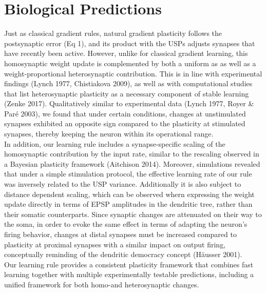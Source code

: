 \documentclass[twocolumn,12pt]{article}
\begin{document}
\section*{Biological Predictions}
\vspace*{-0.3cm}
Just as classical gradient rules, natural gradient plasticity follows the postsynaptic error (Eq 1), and its product with the USPs adjusts synapses that have recently been active. However, unlike for classical gradient learning, this homosynaptic weight update is complemented by both a uniform as as well as a weight-proportional heterosynaptic contribution. This is in line with experimental findings (Lynch 1977, Chistiakova 2009), as well as with computational studies that list heterosynaptic plasticity as a necessary component of stable learning (Zenke 2017). Qualitatively similar to experimental data (Lynch 1977, Royer \& Paré 2003), we found that under certain conditions, changes at unstimulated synapses exhibited an opposite sign compared to the plasticity at stimulated synapses, thereby keeping the neuron within its operational range.\\
In addition, our learning rule includes a synapse-specific scaling of the homosynaptic contribution by the input rate, similar to the rescaling observed in a Bayesian plasticity framework (Aitchison 2014). Moreover, simulations revealed that under a simple stimulation protocol, the effective learning rate of our rule was inversely related to the USP variance. Additionally it is also subject to distance dependent scaling, which can be observed whern expressing the weight update directly in terms of EPSP amplitudes in the dendritic tree, rather than their somatic counterparts.
 Since synaptic changes are attenuated on their way to the soma, in order to evoke the same effect in terms of adapting the neuron's firing behavior, changes at distal synapses must be increased compared to plasticity at proximal synapses with a similar impact on output firing, conceptually reminding of the dendritic democracy concept (Häusser 2001).\\
 Our learning rule provides a consistent plasticity framework that combines fast learning together with multiple experimentally testable predictions, including a unified framework for both homo-and heterosynaptic changes.
\end{document}
